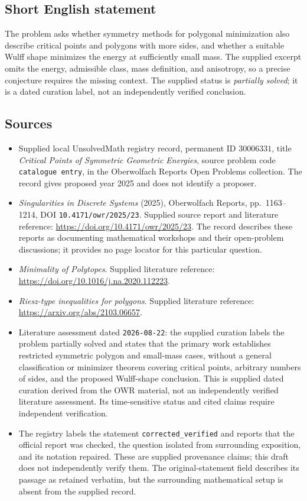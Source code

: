 \documentclass[11pt]{article}
\begin{document}
\subsection{Short English statement}
The problem asks whether symmetry methods for polygonal minimization also describe critical points and polygons with more sides, and whether a suitable Wulff shape minimizes the energy at sufficiently small mass. The supplied excerpt omits the energy, admissible class, mass definition, and anisotropy, so a precise conjecture requires the missing context. The supplied status is \emph{partially solved}; it is a dated curation label, not an independently verified conclusion.
\subsection{Sources}
\begin{itemize}
\item Supplied local UnsolvedMath registry record, permanent ID \(30006331\), title \emph{Critical Points of Symmetric Geometric Energies}, source problem code \texttt{catalogue entry}, in the Oberwolfach Reports Open Problems collection. The record gives proposed year 2025 and does not identify a proposer.
\item \emph{Singularities in Discrete Systems} (2025), Oberwolfach Reports, pp.\ 1163--1214, DOI \texttt{10.4171/owr/2025/23}. Supplied source report and literature reference: \url{https://doi.org/10.4171/owr/2025/23}. The record describes these reports as documenting mathematical workshops and their open-problem discussions; it provides no page locator for this particular question.
\item \emph{Minimality of Polytopes}. Supplied literature reference: \url{https://doi.org/10.1016/j.na.2020.112223}.
\item \emph{Riesz-type inequalities for polygons}. Supplied literature reference: \url{https://arxiv.org/abs/2103.06657}.
\item Literature assessment dated \texttt{2026-08-22}: the supplied curation labels the problem partially solved and states that the primary work establishes restricted symmetric polygon and small-mass cases, without a general classification or minimizer theorem covering critical points, arbitrary numbers of sides, and the proposed Wulff-shape conclusion. This is supplied dated curation derived from the OWR material, not an independently verified literature assessment. Its time-sensitive status and cited claims require independent verification.
\item The registry labels the statement \texttt{corrected\_verified} and reports that the official report was checked, the question isolated from surrounding exposition, and its notation repaired. These are supplied provenance claims; this draft does not independently verify them. The original-statement field describes its passage as retained verbatim, but the surrounding mathematical setup is absent from the supplied record.
\end{itemize}
\end{document}
